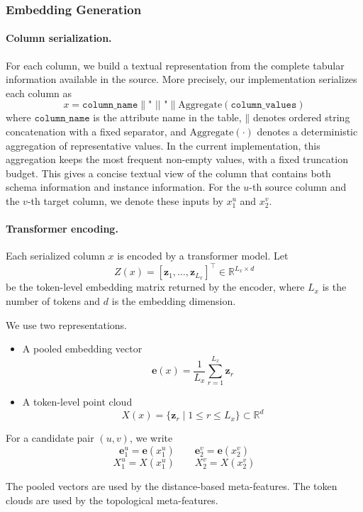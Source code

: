 \documentclass[sigconf, nonacm]{acmart}
\newcommand{\R}{\mathbb{R}}
\newcommand{\Agg}{\mathrm{Aggregate}}
\newcommand{\concat}{\mathbin{\|}}
\begin{document}
\subsubsection{\textbf{Embedding Generation}}
\paragraph{\textbf{Column serialization.}} For each column, we build a textual representation from the complete tabular information available in the source. More precisely, our implementation serializes each column as
\[
x = \texttt{column\_name} \concat \texttt{" || "} \concat \Agg(\texttt{column\_values})
\]
where \(\texttt{column\_name}\) is the attribute name in the table, \(\concat\) denotes ordered string concatenation with a fixed separator, and \(\Agg(\cdot)\) denotes a deterministic aggregation of representative values. In the current implementation, this aggregation keeps the most frequent non-empty values, with a fixed truncation budget. This gives a concise textual view of the column that contains both schema information and instance information.
For the \(u\)-th source column and the \(v\)-th target column, we denote these inputs by \(x_1^u\) and \(x_2^v\).

\paragraph{\textbf{Transformer encoding.}}

Each serialized column \(x\) is encoded by a transformer model. Let
\[
Z(x)=\left[\mathbf{z}_1,\dots,\mathbf{z}_{L_x}\right]^{\top}\in\R^{L_x\times d}
\]
be the token-level embedding matrix returned by the encoder, where \(L_x\) is the number of tokens and \(d\) is the embedding dimension.

We use two representations.
\begin{itemize}[leftmargin=*]
    \item A pooled embedding vector
    \[
    \mathbf{e}(x)=\frac{1}{L_x}\sum_{r=1}^{L_x}\mathbf{z}_r
    \]
    \item A token-level point cloud
    \[
    X(x)=\{\mathbf{z}_r \mid 1\le r \le L_x\}\subset\R^d
    \]
\end{itemize}

For a candidate pair \((u,v)\), we write
\[
\mathbf{e}_1^u=\mathbf{e}(x_1^u) \qquad \mathbf{e}_2^v=\mathbf{e}(x_2^v)
\]
\[
X_1^u=X(x_1^u) \qquad X_2^v=X(x_2^v)
\]

The pooled vectors are used by the distance-based meta-features. The token clouds are used by the topological meta-features.
\end{document}
